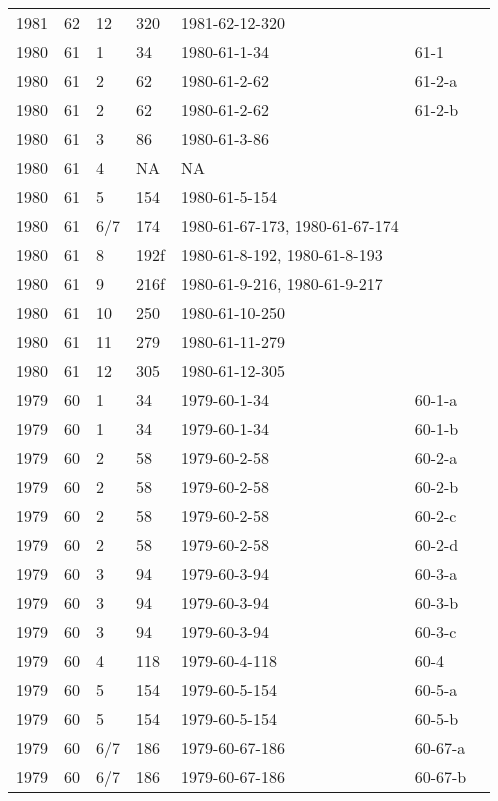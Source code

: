 \begin{longtable}{ |l|l|l|l|p{2.7cm}|l|p{2cm}| }
 1981 & 62 &    12 &     320 & 1981-62-12-320 &  & \\
 1980 & 61 &     1 &      34 &   1980-61-1-34 & 61-1 & \\
 1980 & 61 &     2 &      62 &   1980-61-2-62 & 61-2-a & \\
 1980 & 61 &     2 &      62 &   1980-61-2-62 & 61-2-b & \\
 1980 & 61 &     3 &      86 &   1980-61-3-86 &  & \\
 1980 & 61 &     4 &      NA &    NA          &  & \\
 1980 & 61 &     5 &     154 & 1980-61-5-154  &  & \\
 1980 & 61 &   6/7 &     174 & 1980-61-67-173, 1980-61-67-174 &  & \\
 1980 & 61 &     8 &    192f & 1980-61-8-192, 1980-61-8-193 &  & \\
 1980 & 61 &     9 &    216f & 1980-61-9-216, 1980-61-9-217 &  & \\
 1980 & 61 &    10 &     250 & 1980-61-10-250 &  & \\
 1980 & 61 &    11 &     279 & 1980-61-11-279 &  & \\
 1980 & 61 &    12 &     305 & 1980-61-12-305 &  & \\
 1979 & 60 &     1 &      34 & 1979-60-1-34   & 60-1-a & \\
 1979 & 60 &     1 &      34 & 1979-60-1-34   & 60-1-b & \\
 1979 & 60 &     2 &      58 & 1979-60-2-58   & 60-2-a & \\
 1979 & 60 &     2 &      58 & 1979-60-2-58   & 60-2-b & \\
 1979 & 60 &     2 &      58 & 1979-60-2-58   & 60-2-c & \\
 1979 & 60 &     2 &      58 & 1979-60-2-58   & 60-2-d & \\
 1979 & 60 &     3 &      94 & 1979-60-3-94   & 60-3-a & \\
 1979 & 60 &     3 &      94 & 1979-60-3-94   & 60-3-b & \\
 1979 & 60 &     3 &      94 & 1979-60-3-94   & 60-3-c & \\
 1979 & 60 &     4 &     118 & 1979-60-4-118  & 60-4 & \\
 1979 & 60 &     5 &     154 & 1979-60-5-154  & 60-5-a & \\
 1979 & 60 &     5 &     154 & 1979-60-5-154  & 60-5-b & \\
 1979 & 60 &   6/7 &     186 & 1979-60-67-186 & 60-67-a & \\
 1979 & 60 &   6/7 &     186 & 1979-60-67-186 & 60-67-b & \\

\end{longtable}
